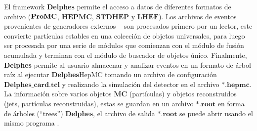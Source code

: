 El framework  \textbf{Delphes} permite el acceso a datos de diferentes formatos de archivo ($\mathbf{Pro}\-\mathbf{MC}$, $\mathbf{HEPMC}$, $\mathbf{STDHEP}$ y $\mathbf{LHEF}$). Los archivos de eventos provenientes de generadores externos \MC ~ son procesados primero por un lector, este convierte partículas estables en una colección de objetos universales, para luego ser procesada por una serie de módulos que comienzan con el módulo de fusión acumulada y terminan con el módulo de buscador de objetos único. Finalmente,  \textbf{Delphes} permite al usuario almacenar y analizar eventos en un formato de árbol raíz al ejecutar  \textbf{Delphes}HepMC tomando un archivo de configuración $\mathbf{ \textbf{Delphes}\_card.tcl}$ y realizando la simulación del detector en el archivo $\mathbf{*.hepmc}$. La información sobre varios objetos \textbf{MC} (partículas) y objetos reconstruidos (jets, partículas reconstruidas), estas se guardan en un archivo $\mathbf{*.root}$ en forma de árboles (``trees'')  \textbf{Delphes}, el archivo de salida $\mathbf{*.root}$ se puede abrir usando el mismo programa \ROOT.





